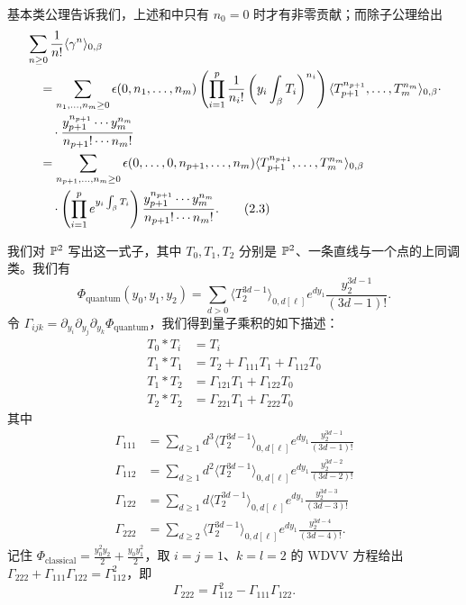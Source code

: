 基本类公理告诉我们，上述和中只有 $n_0=0$ 时才有非零贡献；而除子公理给出
\begin{align}
&\sum_{n\ge 0}\frac{1}{n!}\langle\gamma^n\rangle_{0,\beta}\notag\\
&\quad=\sum_{n_1,\dots,n_m\ge 0}\epsilon(0,n_1,\dots,n_m)\left(\prod_{i=1}^{p}\frac{1}{n_i!}\left(y_i\int_{\beta}T_i\right)^{n_i}\right)\langle T_{p+1}^{n_{p+1}},\dots,T_m^{n_m}\rangle_{0,\beta}\cdot\notag\\
&\qquad\cdot\frac{y_{p+1}^{n_{p+1}}\cdots y_m^{n_m}}{n_{p+1}!\cdots n_m!}\notag\\
&\quad=\sum_{n_{p+1},\dots,n_m\ge 0}\epsilon(0,\dots,0,n_{p+1},\dots,n_m)\langle T_{p+1}^{n_{p+1}},\dots,T_m^{n_m}\rangle_{0,\beta}\notag\\
&\qquad\cdot\left(\prod_{i=1}^{p}e^{y_i\int_{\beta}T_i}\right)\frac{y_{p+1}^{n_{p+1}}\cdots y_m^{n_m}}{n_{p+1}!\cdots n_m!}. \tag{2.3}
\end{align}


我们对 $\mathbb{P}^2$ 写出这一式子，其中 $T_0,T_1,T_2$ 分别是 $\mathbb{P}^2$、一条直线与一个点的上同调类。我们有
\[
\Phi_{\text{quantum}}(y_0,y_1,y_2)=\sum_{d>0}\langle T_2^{3d-1}\rangle_{0,d[\ell]}e^{dy_1}\frac{y_2^{3d-1}}{(3d-1)!}.
\]
令 $\Gamma_{ijk}=\partial_{y_i}\partial_{y_j}\partial_{y_k}\Phi_{\text{quantum}}$，我们得到量子乘积的如下描述：
\begin{align*}
T_0*T_i&=T_i\\
T_1*T_1&=T_2+\Gamma_{111}T_1+\Gamma_{112}T_0\\
T_1*T_2&=\Gamma_{121}T_1+\Gamma_{122}T_0\\
T_2*T_2&=\Gamma_{221}T_1+\Gamma_{222}T_0
\end{align*}
其中
\begin{align*}
\Gamma_{111}&=\sum_{d\ge 1}d^3\langle T_2^{3d-1}\rangle_{0,d[\ell]}e^{dy_1}\frac{y_2^{3d-1}}{(3d-1)!}\\
\Gamma_{112}&=\sum_{d\ge 1}d^2\langle T_2^{3d-1}\rangle_{0,d[\ell]}e^{dy_1}\frac{y_2^{3d-2}}{(3d-2)!}\\
\Gamma_{122}&=\sum_{d\ge 1}d\langle T_2^{3d-1}\rangle_{0,d[\ell]}e^{dy_1}\frac{y_2^{3d-3}}{(3d-3)!}\\
\Gamma_{222}&=\sum_{d\ge 2}\langle T_2^{3d-1}\rangle_{0,d[\ell]}e^{dy_1}\frac{y_2^{3d-4}}{(3d-4)!}.
\end{align*}
记住 $\Phi_{\text{classical}}=\frac{y_0^2y_2}{2}+\frac{y_0y_1^2}{2}$，取 $i=j=1$、$k=l=2$ 的 WDVV 方程给出 $\Gamma_{222}+\Gamma_{111}\Gamma_{122}=\Gamma_{112}^2$，即
\[
\Gamma_{222}=\Gamma_{112}^2-\Gamma_{111}\Gamma_{122}.
\]

